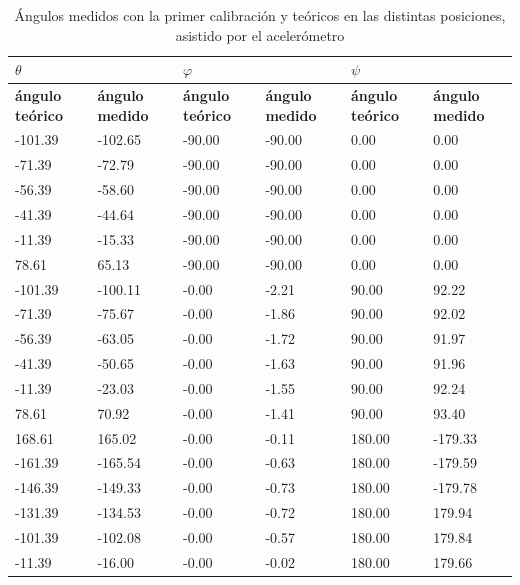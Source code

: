 \documentclass[main]{subfiles}
\begin{document}
\begin{table}
\begin{tabular}{|p{50pt}|p{50pt}|p{50pt}|p{51pt}|p{50pt}|p{50pt}|}
\hline
  
\multicolumn{2}{|p{113pt}|}{\cellcolor[gray]{0.6} $\theta$}  
& \multicolumn{2}{|p{114pt}|}{\cellcolor[gray]{0.6} $\varphi$}
& \multicolumn{2}{|p{113pt}|}{\cellcolor[gray]{0.6} $\psi$} 
\\ \hline 
   

 \multicolumn{1}{|p{50pt}|}{\cellcolor[gray]{0.7} \textbf{\'angulo te\'orico }} 
& \multicolumn{1}{|p{50pt}|}{\cellcolor[gray]{0.8} \textbf{ángulo medido}}
& \multicolumn{1}{|p{50pt}|}{\cellcolor[gray]{0.7} \textbf{\'angulo te\'orico }} 
& \multicolumn{1}{|p{50pt}|}{\cellcolor[gray]{0.8} \textbf{ángulo medido}}
& \multicolumn{1}{|p{50pt}|}{\cellcolor[gray]{0.7} \textbf{\'angulo te\'orico }} 
& \multicolumn{1}{|p{50pt}|}{\cellcolor[gray]{0.8} \textbf{ángulo medido}}
\\ \hline

-101.39&-102.65&-90.00&-90.00&  0.00&   0.00\\ \hline
 -71.39& -72.79&-90.00&-90.00&  0.00&   0.00\\ \hline
 -56.39& -58.60&-90.00&-90.00&  0.00&   0.00\\ \hline
 -41.39& -44.64&-90.00&-90.00&  0.00&   0.00\\ \hline
 -11.39& -15.33&-90.00&-90.00&  0.00&   0.00\\ \hline
  78.61&  65.13&-90.00&-90.00&  0.00&   0.00\\ \hline
-101.39&-100.11& -0.00& -2.21& 90.00&  92.22\\ \hline
 -71.39& -75.67& -0.00& -1.86& 90.00&  92.02\\ \hline
 -56.39& -63.05& -0.00& -1.72& 90.00&  91.97\\ \hline
 -41.39& -50.65& -0.00& -1.63& 90.00&  91.96\\ \hline
 -11.39& -23.03& -0.00& -1.55& 90.00&  92.24\\ \hline
  78.61&  70.92& -0.00& -1.41& 90.00&  93.40\\ \hline
 168.61& 165.02& -0.00& -0.11&180.00&-179.33\\ \hline
-161.39&-165.54& -0.00& -0.63&180.00&-179.59\\ \hline
-146.39&-149.33& -0.00& -0.73&180.00&-179.78\\ \hline
-131.39&-134.53& -0.00& -0.72&180.00& 179.94\\ \hline
-101.39&-102.08& -0.00& -0.57&180.00& 179.84\\ \hline
 -11.39& -16.00& -0.00& -0.02&180.00& 179.66\\ \hline
\end{tabular}
\caption{Ángulos medidos con la primer calibración y teóricos en las distintas posiciones, asistido por el aceler\'ometro}



\end{table}
\end{document}
